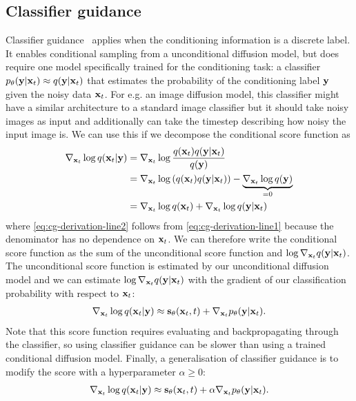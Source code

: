 \subsection{Classifier guidance}
Classifier guidance~\citep{song2020score} applies when the conditioning information is a discrete label. It enables conditional sampling from a unconditional diffusion model, but does require one model specifically trained for the conditioning task: a classifier $p_\theta({\mathbf{y}}|{\mathbf{x}}_t) \approx q({\mathbf{y}}|{\mathbf{x}}_t)$ that estimates the probability of the conditioning label ${\mathbf{y}}$ given the noisy data ${\mathbf{x}}_t$. For e.g. an image diffusion model, this classifier might have a similar architecture to a standard image classifier but it should take noisy images as input and additionally can take the timestep describing how noisy the input image is. We can use this if we decompose the conditional score function as
\begin{align}
    \nabla_{{\mathbf{x}}_t} \log q({\mathbf{x}}_t|{\mathbf{y}}) &= \nabla_{{\mathbf{x}}_t} \log \frac{q({\mathbf{x}}_t)q({\mathbf{y}}|{\mathbf{x}}_t)}{q({\mathbf{y}})} \label{eq:cg-derivation-line1} \\
    &= \nabla_{{\mathbf{x}}_t} \log \left( q({\mathbf{x}}_t) q({\mathbf{y}}|{\mathbf{x}}_t) \right) - \underbrace{\nabla_{{\mathbf{x}}_t} \log q({\mathbf{y}})}_{=0}  \label{eq:cg-derivation-line2} \\
    &= \nabla_{{\mathbf{x}}_t} \log q({\mathbf{x}}_t) + \nabla_{{\mathbf{x}}_t} \log q({\mathbf{y}}|{\mathbf{x}}_t)  \label{eq:cg-derivation-line3}
\end{align}
where \cref{eq:cg-derivation-line2} follows from \cref{eq:cg-derivation-line1} because the denominator has no dependence on ${\mathbf{x}}_t$. We can therefore write the conditional score function as the sum of the unconditional score function and $\log \nabla_{{\mathbf{x}}_t} q({\mathbf{y}}|{\mathbf{x}}_t)$. The unconditional score function is estimated by our unconditional diffusion model and we can estimate $\log \nabla_{{\mathbf{x}}_t} q({\mathbf{y}}|{\mathbf{x}}_t)$ with the gradient of our classification probability with respect to ${\mathbf{x}}_t$:
\begin{align}
    \nabla_{{\mathbf{x}}_t} \log q({\mathbf{x}}_t|{\mathbf{y}}) \approx {\mathbf{s}}_\theta({\mathbf{x}}_t, t) + \nabla_{{\mathbf{x}}_t} p_\theta({\mathbf{y}}|{\mathbf{x}}_t).
\end{align}
Note that this score function requires evaluating and backpropagating through the classifier, so using classifier guidance can be slower than using a trained conditional diffusion model. Finally, a generalisation of classifier guidance is to modify the score with a hyperparameter $\alpha \geq 0$:
\begin{align}
    \nabla_{{\mathbf{x}}_t} \log q({\mathbf{x}}_t|{\mathbf{y}}) \approx {\mathbf{s}}_\theta({\mathbf{x}}_t, t) + \alpha \nabla_{{\mathbf{x}}_t} p_\theta({\mathbf{y}}|{\mathbf{x}}_t). \label{eq:cg-score-function}
\end{align}
